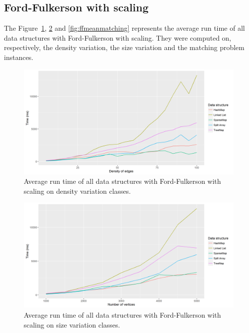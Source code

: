 \subsection{Ford-Fulkerson with scaling}
The Figure~\ref{fig:ffmeandensity}, \ref{fig:ffmeansize} and \ref{fig:ffmeanmatching} represents the average run time of all data structures with Ford-Fulkerson with scaling. They were computed on, respectively, the density variation, the size variation and the matching problem instances.
\begin{figure}[H]
\begin{center}
\includegraphics[scale=0.5]{images/results/ffmeandensity.png}
\caption{Average run time of all data structures with Ford-Fulkerson with scaling on density variation classes.}
\label{fig:ffmeandensity}
\end{center}
\end{figure}
\begin{figure}[H]
\begin{center}
\includegraphics[scale=0.5]{images/results/ffmeansize.png}
\caption{Average run time of all data structures with Ford-Fulkerson with scaling on size variation classes.}
\label{fig:ffmeansize}
\end{center}
\end{figure}
